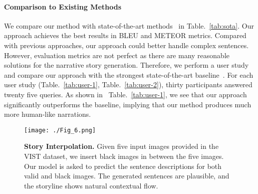 \documentclass[letterpaper]{article} \usepackage{aaai20}  \usepackage{times}  \usepackage{helvet} \usepackage{courier}  \usepackage[hyphens]{url}  \usepackage{graphicx} \urlstyle{rm} \def\UrlFont{\rm}  \usepackage{graphicx}  \frenchspacing  \setlength{\pdfpagewidth}{8.5in}  \setlength{\pdfpageheight}{11in}
\newcommand{\tabref}[1]{Table.~\ref{#1}}
\begin{document}
\paragraph{Comparison to Existing Methods}
\quad

\noindent
We compare our method with state-of-the-art methods~\cite{huang2016visual,yu2017hierarchically,wang2018no,wang2019hierarchical,huang2019hierarchically} in \tabref{tab:sota}. Our approach achieves the best results in BLEU and METEOR metrics. Compared with previous approaches, our approach could better handle complex sentences. However,
evaluation metrics are not perfect as there are many reasonable solutions for the narrative story generation. Therefore, we perform a user study and compare our approach with the strongest state-of-the-art baseline~\cite{wang2018no}. For each user study (\tabref{tab:user-1}, \tabref{tab:user-2}), thirty participants answered twenty five queries.
As shown in ~\tabref{tab:user-1}, we see that our approach significantly outperforms the baseline, implying that our method produces much more human-like narrations.

\begin{table}
\centering
{}
\caption{\textbf{Baseline vs INet} without hiding in the test.  }
\label{tab:user-1}
\end{table}

\begin{table}
\centering
{}
\caption{\textbf{ INet vs .} In inference stage, we compare the story generated by INet with and without hidden images.}
\label{tab:user-2}
\end{table}

\begin{figure*}[t]
\centering
\texttt{[image: ./Fig\_6.png]}
\caption{\textbf{Story Interpolation.} Given five input images provided in the VIST dataset, we insert black images in between the five images. Our model is asked to predict the sentence descriptions for both valid and black images. The generated sentences are plausible, and the storyline shows natural contextual flow.}
\label{fig:interpolation}
\end{figure*}
\end{document}
